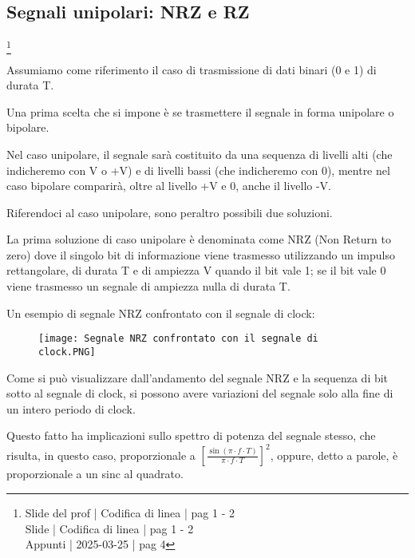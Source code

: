 \newpage 

\subsection{Segnali unipolari: NRZ e RZ}
\footnote{Slide del prof | Codifica di linea | pag 1 - 2\\  
Slide | Codifica di linea | pag  1 - 2\\
Appunti | 2025-03-25 | pag 4
}

Assumiamo come riferimento il caso di trasmissione di dati binari (0 e 1) di durata T. \newline 

Una prima scelta che si impone è se trasmettere il segnale in forma unipolare o bipolare. \newline 

Nel caso unipolare, il segnale sarà costituito da una sequenza di livelli alti (che indicheremo con V o +V) e di livelli bassi (che indicheremo con 0), 
mentre nel caso bipolare comparirà, oltre al livello +V e 0, anche il livello -V. \newline 

Riferendoci al caso unipolare, sono peraltro possibili due soluzioni. \newline 

La prima soluzione di caso unipolare è denominata come NRZ (Non Return to zero) dove il singolo bit di informazione viene trasmesso utilizzando un impulso rettangolare, di durata T e di ampiezza V 
quando il bit vale 1; se il bit vale 0 viene trasmesso un segnale di ampiezza nulla di durata T. \newline 

Un esempio di segnale NRZ confrontato con il segnale di clock: 

\begin{figure}[h]
    \centering
    \texttt{[image: Segnale NRZ confrontato con il segnale di clock.PNG]}
\end{figure}

Come si può visualizzare dall'andamento del segnale NRZ e la sequenza di bit sotto al segnale di clock, 
si possono avere variazioni del segnale solo alla fine di un intero periodo di clock. \newline 

Questo fatto ha implicazioni sullo spettro di potenza del segnale stesso, 
che risulta, in questo caso, proporzionale a $\left[ \frac{\sin(\pi \cdot f \cdot T)}{\pi \cdot f \cdot T}\right]^{2}$, 
oppure, detto a parole, è proporzionale a un sinc al quadrato. \newline 

